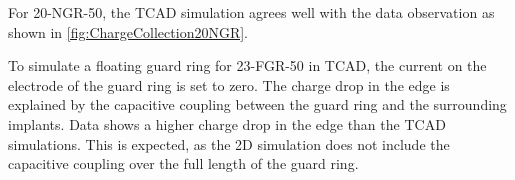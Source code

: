 For 20-NGR-50, the TCAD simulation agrees well with the data
observation as shown in \cref{fig:ChargeCollection20NGR}.

To simulate a floating guard ring for 23-FGR-50 in TCAD, the current
on the electrode of the guard ring is set to zero. The charge drop in
the edge is explained by the capacitive coupling between the guard
ring and the surrounding implants. Data shows a higher charge drop in
the edge than the TCAD simulations. This is expected, as the 2D
simulation does not include the capacitive coupling over the full
length of the guard ring.


